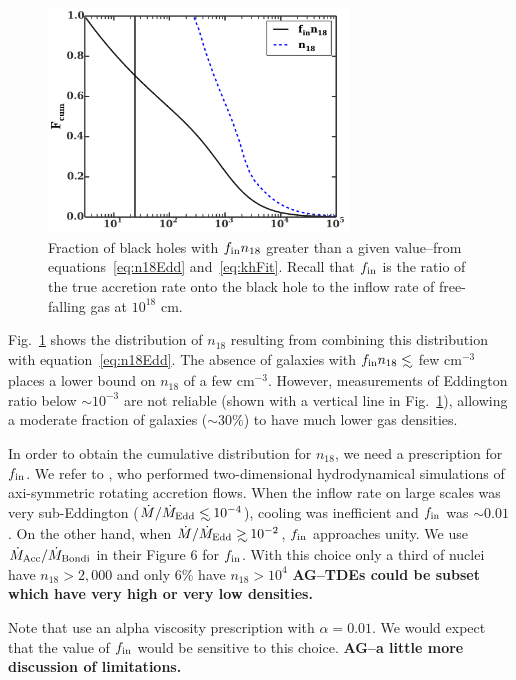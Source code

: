 \documentclass[usenatbib,fleqn]{mnras}
\newcommand\lsim{\mathrel{\rlap{\lower4pt\hbox{\hskip1pt$\sim$}}
    \raise1pt\hbox{$<$}}}
\newcommand\gsim{\mathrel{\rlap{\lower4pt\hbox{\hskip1pt$\sim$}}
    \raise1pt\hbox{$>$}}}
\begin{document}
\begin{figure}
\includegraphics[width=8cm]{fcum_n18.pdf}
\caption{\label{fig:n18Cum} Fraction of black holes with $f_{\rm in}
  n_{18}$ greater than a given value--from equations~\eqref{eq:n18Edd}
  and~\eqref{eq:khFit}. Recall that $f_{\rm in}$ is the ratio of the
  true accretion rate onto the black hole to the inflow rate of
  free-falling gas at $10^{18}$ cm.   
}
\end{figure}


Fig.~\ref{fig:n18Cum} shows the distribution of $n_{18}$ resulting
from combining this distribution with equation~\eqref{eq:n18Edd}.  The
absence of galaxies with $f_{\rm in }n_{18} \lsim$ few cm$^{-3}$
places a lower bound on $n_{18}$ of a few cm$^{-3}$.  However,
measurements of Eddington ratio below $\sim 10^{-3}$ are not reliable
(shown with a vertical line in Fig.~\ref{fig:n18Cum}), allowing
a moderate fraction of galaxies ($\sim 30\%$) to have much lower gas
densities.


In order to obtain the cumulative distribution for $n_{18}$, we need a
prescription for $f_{\rm in}$. We refer to \citet{Li+2013}, who
performed two-dimensional hydrodynamical simulations of axi-symmetric
rotating accretion flows. When the inflow rate on large scales was
very sub-Eddington ($\dot{M}/\dot{M}_{\rm Edd} \lsim 10^{-4}$),
cooling was inefficient and $f_{\rm in}$ was $\sim 0.01$. On the other
hand, when $\dot{M}/\dot{M}_{\rm Edd}\gsim 10^{-2}$, $f_{\rm in}$
approaches unity.  We use $\dot{M}_{\rm Acc}/\dot{M}_{\rm Bondi}$ in
their Figure 6 for $f_{\rm in}$.  With this choice only a third of
nuclei have $n_{18}>2,000$ and only 6\% have $n_{18}>10^{4}$ {\bf
  AG--TDEs could be subset which have very high or very low
  densities.}

Note that \citet{Li+2013} use an alpha viscosity prescription with
$\alpha=0.01$. We would expect that the value of $f_{\rm in}$ would be
sensitive to this choice. {\bf AG--a little more discussion of limitations.}
\end{document}
